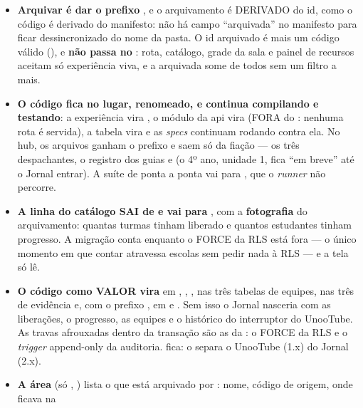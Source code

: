 \begin{itemize}
  \item \textbf{Arquivar é dar o prefixo }, e o arquivamento é
    DERIVADO do id, como o código é derivado do manifesto: não há campo
    \enquote{arquivada} no manifesto para ficar dessincronizado do nome da
    pasta. O id arquivado é  mais um código válido
    (), e \textbf{não passa no }: rota,
    catálogo, grade da sala e painel de recursos aceitam só experiência viva, e
    a arquivada some de todos sem um filtro a mais.
  \item \textbf{O código fica no lugar, renomeado, e continua compilando e
    testando}: a experiência vira , o
    módulo da api vira  (FORA do
    : nenhuma rota é servida), a tabela vira
     e as \emph{specs} continuam rodando contra
    ela. No hub, os arquivos ganham o prefixo e saem só da fiação --- os três
    despachantes, o registro dos guias e  (o 4º ano,
    unidade 1, fica \enquote{em breve} até o Jornal entrar). A suíte de ponta a
    ponta vai para , que o \emph{runner} não percorre.
  \item \textbf{A linha do catálogo SAI de  e vai para
    }, com a \textbf{fotografia} do arquivamento:
    quantas turmas tinham liberado e quantos estudantes tinham progresso.
    A migração conta enquanto o FORCE da RLS está fora --- o único momento em
    que contar atravessa escolas sem pedir nada à RLS --- e a tela só lê.
  \item \textbf{O código como VALOR vira } em
    , , , nas três
    tabelas de equipes, nas três de evidência e, com o prefixo
    , em  e . Sem
    isso o Jornal nasceria com as liberações, o progresso, as equipes e o
    histórico do interruptor do UnooTube. As travas afrouxadas dentro da
    transação são as da : o FORCE da RLS e o \emph{trigger}
    append-only da auditoria.  fica: o
     separa o UnooTube (1.x) do Jornal (2.x).
  \item \textbf{A área } (só ,
    ) lista o que está arquivado por
    : nome, código de origem, onde ficava na

\end{itemize}
